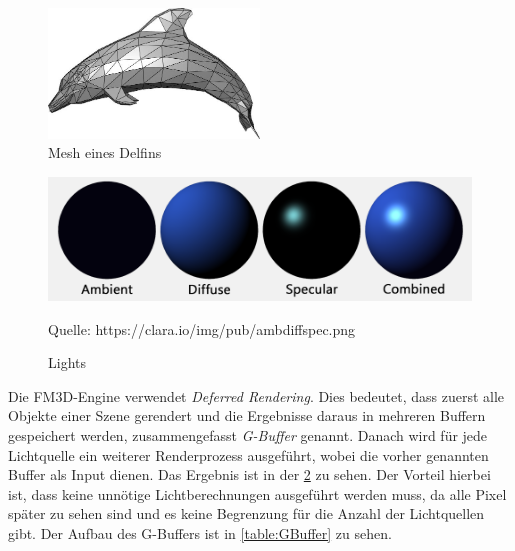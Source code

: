 \begin{figure}
	\begin{center}
		\includegraphics[width=0.5\textwidth]{06anhang/bilder/delphin.jpg}
		\caption{Mesh eines Delfins}
		\label{Dolphin}
	\end{center}
\end{figure}
\begin{figure}
	\centering
	\includegraphics[scale=0.4]{02theorie/amb_diff_spec.png}
		
	Quelle: https://clara.io/img/pub/amb\textunderscore diff\textunderscore spec.png
	\caption{Lights}\label{Img:Lights}
\end{figure}

Die FM3D-Engine verwendet \textit{Deferred Rendering}. Dies bedeutet, dass zuerst alle Objekte einer Szene gerendert und die Ergebnisse daraus in mehreren Buffern gespeichert werden, zusammengefasst \textit{G-Buffer} genannt. Danach wird für jede Lichtquelle ein weiterer Renderprozess ausgeführt, wobei die vorher genannten Buffer als Input dienen. Das Ergebnis ist in der \cref{Img:Lights} zu sehen. Der Vorteil hierbei ist, dass keine unnötige Lichtberechnungen ausgeführt werden muss, da alle Pixel später zu sehen sind und es keine Begrenzung für die Anzahl der Lichtquellen gibt. Der Aufbau des G-Buffers ist in \cref{table:GBuffer} zu sehen.

